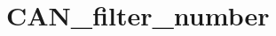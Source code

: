 \hypertarget{group___c_a_n__filter__number}{\section{C\-A\-N\-\_\-filter\-\_\-number}
\label{group___c_a_n__filter__number}
}
